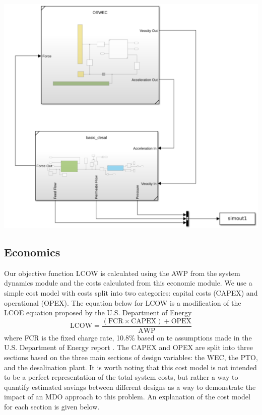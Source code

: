 \documentclass[twocolumn,10pt]{asme2e}
\begin{document}
\begin{center}
    \includegraphics[width=\linewidth]{../figs/coupledsimscape.pdf}
    \label{fig:coupled_system}
\end{center}

\subsection{Economics}

Our objective function LCOW is calculated using the AWP from the system dynamics module and the costs calculated from this economic module. We use a simple cost model with costs split into two categories: capital costs (CAPEX) and operational (OPEX). The equation below for LCOW is a modification of the LCOE equation proposed by the U.S. Department of Energy \cite{LCOE_DOE}
\begin{equation}
    \text{LCOW} = \frac{(\text{FCR}\times\text{CAPEX}) + \text{OPEX}}{\text{AWP}}
\end{equation}
where FCR is the fixed charge rate, 10.8\% based on te assumptions made in the U.S. Department of Energy report \cite{LCOE_DOE}. The CAPEX and OPEX are split into three sections based on the three main sections of design variables: the WEC, the PTO, and the desalination plant. It is worth noting that this cost model is not intended to be a perfect representation of the total system costs, but rather a way to quantify estimated savings between different designs as a way to demonstrate the impact of an MDO approach to this problem. An explanation of the cost model for each section is given below.
\end{document}
